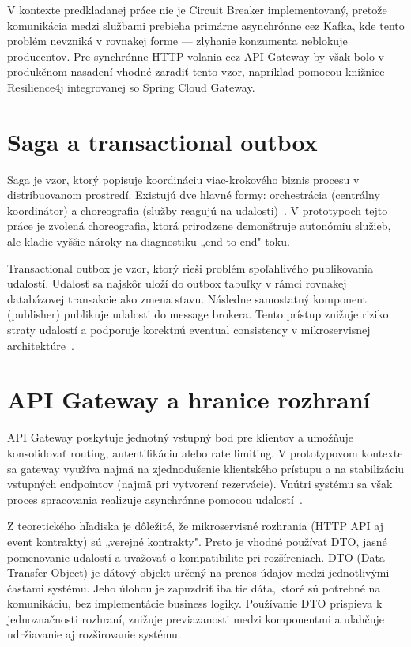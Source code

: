 V kontexte predkladanej práce nie je Circuit Breaker implementovaný, pretože komunikácia medzi službami prebieha primárne asynchrónne cez Kafka, kde tento problém nevzniká v rovnakej forme — zlyhanie konzumenta neblokuje producentov. Pre synchrónne HTTP volania cez API Gateway by však bolo v produkčnom nasadení vhodné zaradiť tento vzor, napríklad pomocou knižnice Resilience4j integrovanej so Spring Cloud Gateway.

\section{Saga a transactional outbox}

Saga je vzor, ktorý popisuje koordináciu viac-krokového biznis procesu v distribuovanom prostredí. Existujú dve hlavné formy: orchestrácia (centrálny koordinátor) a choreografia (služby reagujú na udalosti)~\cite{Richardson2018}. V prototypoch tejto práce je zvolená choreografia, ktorá prirodzene demonštruje autonómiu služieb, ale kladie vyššie nároky na diagnostiku „end-to-end" toku.

Transactional outbox je vzor, ktorý rieši problém spoľahlivého publikovania udalostí. Udalosť sa najskôr uloží do outbox tabuľky v rámci rovnakej databázovej transakcie ako zmena stavu. Následne samostatný komponent (publisher) publikuje udalosti do message brokera. Tento prístup znižuje riziko straty udalostí a podporuje korektnú eventual consistency v mikroservisnej architektúre~\cite{Richardson2018}.

\section{API Gateway a hranice rozhraní}

API Gateway poskytuje jednotný vstupný bod pre klientov a umožňuje konsolidovať routing, autentifikáciu alebo rate limiting. V prototypovom kontexte sa gateway využíva najmä na zjednodušenie klientského prístupu a na stabilizáciu vstupných endpointov (najmä pri vytvorení rezervácie). Vnútri systému sa však proces spracovania realizuje asynchrónne pomocou udalostí~\cite{SpringCloudGateway2025}.

Z teoretického hľadiska je dôležité, že mikroservisné rozhrania (HTTP API aj event kontrakty) sú „verejné kontrakty". Preto je vhodné používať DTO, jasné pomenovanie udalostí a uvažovať o kompatibilite pri rozšíreniach. DTO (Data Transfer Object) je dátový objekt určený na prenos údajov medzi jednotlivými časťami systému. Jeho úlohou je zapuzdriť iba tie dáta, ktoré sú potrebné na komunikáciu, bez implementácie business logiky. Používanie DTO prispieva k jednoznačnosti rozhraní, znižuje previazanosti medzi komponentmi a uľahčuje udržiavanie aj rozširovanie systému.

